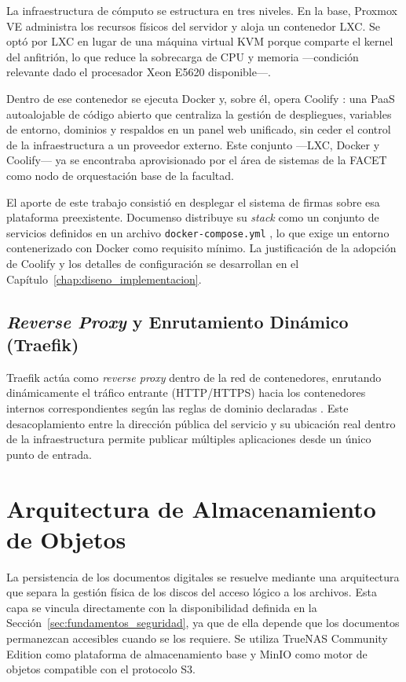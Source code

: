 La infraestructura de cómputo se estructura en tres niveles. En la base, Proxmox VE \cite{proxmox_docs,bilbao_lutz_virtualizacion_2024} administra los recursos físicos del servidor y aloja un contenedor LXC. Se optó por LXC en lugar de una máquina virtual KVM porque comparte el kernel del anfitrión, lo que reduce la sobrecarga de CPU y memoria ---condición relevante dado el procesador Xeon E5620 disponible---.

Dentro de ese contenedor se ejecuta Docker \cite{docker_docs} y, sobre él, opera Coolify \cite{coolify_docs}: una PaaS autoalojable de código abierto que centraliza la gestión de despliegues, variables de entorno, dominios y respaldos en un panel web unificado, sin ceder el control de la infraestructura a un proveedor externo. Este conjunto ---LXC, Docker y Coolify--- ya se encontraba aprovisionado por el área de sistemas de la FACET como nodo de orquestación base de la facultad.

El aporte de este trabajo consistió en desplegar el sistema de firmas sobre esa plataforma preexistente. Documenso distribuye su \textit{stack} como un conjunto de servicios definidos en un archivo \texttt{docker-compose.yml} \cite{documenso_github}, lo que exige un entorno contenerizado con Docker como requisito mínimo. La justificación de la adopción de Coolify y los detalles de configuración se desarrollan en el Capítulo~\ref{chap:diseno_implementacion}.

\subsection{\textit{Reverse Proxy} y Enrutamiento Dinámico (Traefik)}
Traefik actúa como \textit{reverse proxy} dentro de la red de contenedores, enrutando dinámicamente el tráfico entrante (HTTP/HTTPS) hacia los contenedores internos correspondientes según las reglas de dominio declaradas \cite{traefik_docs}. Este desacoplamiento entre la dirección pública del servicio y su ubicación real dentro de la infraestructura permite publicar múltiples aplicaciones desde un único punto de entrada.

\section{Arquitectura de Almacenamiento de Objetos}
\label{sec:almacenamiento}

La persistencia de los documentos digitales se resuelve mediante una arquitectura que separa la gestión física de los discos del acceso lógico a los archivos. Esta capa se vincula directamente con la disponibilidad definida en la Sección~\ref{sec:fundamentos_seguridad}, ya que de ella depende que los documentos permanezcan accesibles cuando se los requiere. Se utiliza TrueNAS Community Edition \cite{truenas} como plataforma de almacenamiento base y MinIO \cite{minio} como motor de objetos compatible con el protocolo S3.

